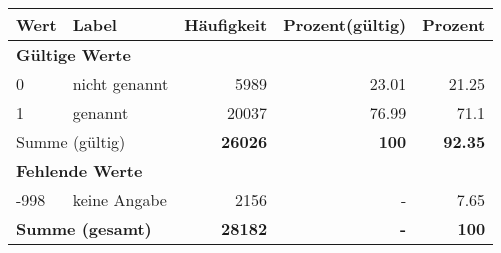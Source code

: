      \begin{longtable}{lXrrr}
     \toprule
     \textbf{Wert} & \textbf{Label} & \textbf{Häufigkeit} & \textbf{Prozent(gültig)} & \textbf{Prozent} \\
     \endhead
     \midrule
     \multicolumn{5}{l}{\textbf{Gültige Werte}}\\

     0 &
     \multicolumn{1}{X}{ nicht genannt   } &


       \num{5989} &
       \num[round-mode=places,round-precision=2]{23.01} &
         \num[round-mode=places,round-precision=2]{21.25} \\

     1 &
     \multicolumn{1}{X}{ genannt   } &


       \num{20037} &
       \num[round-mode=places,round-precision=2]{76.99} &
         \num[round-mode=places,round-precision=2]{71.1} \\
     \midrule
     \multicolumn{2}{l}{Summe (gültig)} &
       \textbf{\num{26026}} &
     \textbf{100} &
       \textbf{\num[round-mode=places,round-precision=2]{92.35}} \\
     \multicolumn{5}{l}{\textbf{Fehlende Werte}}\\
       -998 &
       keine Angabe &
         \num{2156} &
        - &
         \num[round-mode=places,round-precision=2]{7.65} \\
     \midrule
     \multicolumn{2}{l}{\textbf{Summe (gesamt)}} &
          \textbf{\num{28182}} &
        \textbf{-} &
        \textbf{100} \\
     \bottomrule
     \end{longtable}
     
